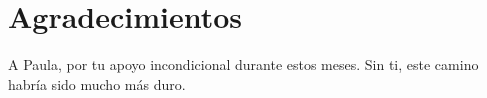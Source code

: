 \chapter*{Agradecimientos}
A Paula, por tu apoyo incondicional durante estos meses. Sin ti, este camino habría sido mucho más duro.